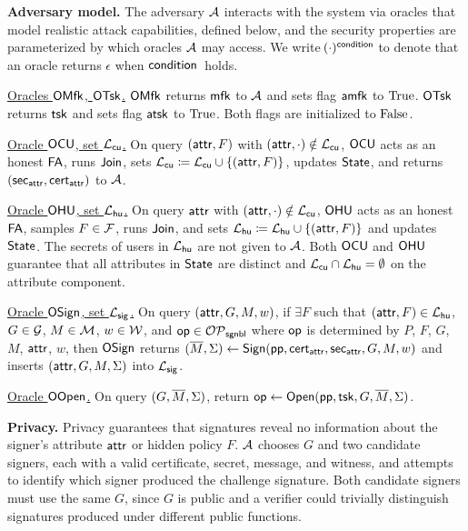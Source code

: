 \medskip
\noindent\textbf{Adversary model.}
The adversary $\mathcal{A}$ interacts with the system via oracles
that model realistic attack capabilities,
defined below,
and the security properties are parameterized by which oracles $\mathcal{A}$ may access.
We write $\!(\cdot)^{\mathsf{condition}}$ to denote that an oracle returns $\epsilon$
when $\mathsf{condition}$~holds.

\medskip
\noindent\underline{Oracles $\mathsf{OMfk}$, $\mathsf{OTsk}$.}
$\mathsf{OMfk}$ returns $\mathsf{mfk}$ to $\mathcal{A}$ and sets flag $\mathsf{amfk}$ to $\mathrm{True}$.
$\mathsf{OTsk}$ returns $\mathsf{tsk}$ and sets flag $\mathsf{atsk}$ to $\mathrm{True}$.
Both flags are initialized to $\mathrm{False}$.

\medskip
\noindent\underline{Oracle $\mathsf{OCU}$, set $\mathcal{L}_\mathsf{cu}$.}
On query $(\mathsf{attr}, F)$ with $(\mathsf{attr}, \cdot) \notin \mathcal{L}_\mathsf{cu}$,
$\mathsf{OCU}$ acts as an honest $\mathsf{FA}$, runs $\mathsf{Join}$,
sets $\mathcal{L}_\mathsf{cu} \coloneqq \mathcal{L}_\mathsf{cu} \cup \{(\mathsf{attr}, F)\}$,
updates $\mathsf{State}$, and returns $(\mathsf{sec}_{\mathsf{attr}}, \mathsf{cert}_{\mathsf{attr}})$ to $\mathcal{A}$.

\medskip
\noindent\underline{Oracle $\mathsf{OHU}$, set $\mathcal{L}_\mathsf{hu}$.}
On query $\mathsf{attr}$ with $(\mathsf{attr}, \cdot) \notin \mathcal{L}_\mathsf{cu}$,
$\mathsf{OHU}$ acts as an honest $\mathsf{FA}$, samples $F \in \mathcal{F}$, runs $\mathsf{Join}$,
and sets $\mathcal{L}_\mathsf{hu} \coloneqq \mathcal{L}_\mathsf{hu} \cup \{(\mathsf{attr}, F)\}$ and updates $\mathsf{State}$.
The secrets of users in $\mathcal{L}_\mathsf{hu}$ are not given to $\mathcal{A}$.
Both $\mathsf{OCU}$ and $\mathsf{OHU}$ guarantee that
all attributes in $\mathsf{State}$ are distinct
and $\mathcal{L}_\mathsf{cu} \cap \mathcal{L}_\mathsf{hu} = \emptyset$ on the attribute component.

\medskip
\noindent\underline{Oracle $\mathsf{OSign}$, set $\mathcal{L}_\mathsf{sig}$.}
On query $(\mathsf{attr}, G, M, w)$,
if $\exists F$ such that $(\mathsf{attr}, F) \in \mathcal{L}_\mathsf{hu}$,
$G \in \mathcal{G}$, $M \in \mathcal{M}$, $w \in \mathcal{W}$,
and $\mathsf{op} \in \mathcal{OP}_\mathsf{sgnbl}$ where $\mathsf{op}$ is determined by $P$, $F$, $G$, $M$, $\mathsf{attr}$, $w$,
then $\mathsf{OSign}$ returns
$(\overline{M}, \Sigma) \gets \mathsf{Sign}(\mathsf{pp}, \mathsf{cert}_{\mathsf{attr}}, \mathsf{sec}_{\mathsf{attr}}, G, M, w)$
and inserts $(\mathsf{attr}, G, M, \Sigma)$ into $\mathcal{L}_\mathsf{sig}$.

\medskip
\noindent\underline{Oracle $\mathsf{OOpen}$.}
On query $(G, \overline{M}, \Sigma)$,
return $\mathsf{op} \gets \mathsf{Open}(\mathsf{pp}, \mathsf{tsk}, G, \overline{M}, \Sigma)$.

\medskip
\noindent\textbf{Privacy.}
Privacy guarantees that \SMS signatures reveal no information about
the signer's attribute $\mathsf{attr}$ or hidden policy $F$.
$\mathcal{A}$ chooses $G$ and two candidate signers,
each with a valid certificate, secret, message, and witness,
and attempts to identify which signer produced the challenge signature.
Both candidate signers must use the same $G$,
since $G$ is public and a verifier could trivially distinguish
signatures produced under different public functions.

